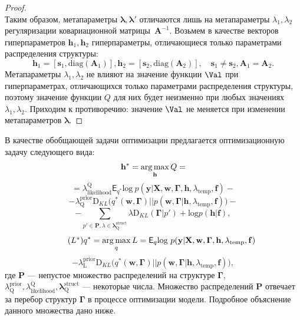 \begin{proof}
\[\]
Таким образом, метапараметры $\boldsymbol{\lambda},\boldsymbol{\lambda}'$ отличаются лишь на метапараметры  $\lambda_1, \lambda_2$ регуляризации ковариационной матрицы~$\mathbf{A}^{-1}$. 
Возьмем в качестве векторов гиперпараметров $\mathbf{h}_1,\mathbf{h}_2$ гиперпараметры, отличающиеся только параметрами распределения структуры:
\[
    \mathbf{h}_1 = [\mathbf{s}_1, \text{diag}(\mathbf{A}_1)], \mathbf{h}_2 = [\mathbf{s}_2, \text{diag}(\mathbf{A}_2)],\quad \mathbf{s}_1 \neq \mathbf{s}_2, \mathbf{A}_1 = \mathbf{A}_2.
\]
Метапараметры $\lambda_1, \lambda_2$ не влияют на значение функции $\Val$ при гиперпараметрах, отличающихся только параметрами распределения структуры, поэтому значение функции $Q$ для них будет неизменно при любых значениях $\lambda_1, \lambda_2$. Приходим к противоречию: значение $\Val$ не меняется при изменении метапараметров $\boldsymbol{\lambda}$.

\end{proof}
\iffalse
В качестве обобщающей задачи оптимизации предлагается оптимизационную задачу следующего вида:
\begin{equation}
\label{eq:qopt}
\mathbf{h}^{*} = \operatorname*{arg\,max}_{\mathbf{h}} Q = 
\end{equation}
\[
= {\lambda_\text{likelihood}^\text{Q}\mathsf{E}_{{q}^{*}} \text{log}~{p(\mathbf{y} | \mathbf{X}, \mathbf{w},\boldsymbol{\Gamma}, \mathbf{h}, \lambda_\text{temp}, \mathbf{f})}}
 -\]
\vspace{-0.3cm}
\[- {\lambda^\text{prior}_\text{Q}\text{D}_{KL}\bigl( q^{*}(\mathbf{w}, \boldsymbol{\Gamma}) || p(\mathbf{w}, \boldsymbol{\Gamma} |\mathbf{h}, \lambda_{\text{temp}},\mathbf{f}) \bigr)}  -\]
\vspace{-0.3cm}
\[
-{\sum_{p' \in \mathbf{P}, \lambda \in \boldsymbol{\lambda}^\text{struct}_\text{Q}} \lambda\text{D}_{KL}(\boldsymbol{\Gamma} | p')+\text{log}p(\mathbf{h}|\mathbf{f})}, 
\]
\begin{equation}
\tag{$L^{*}$}
{q}^{*} = \argmax_{q} L = 
{\mathsf{E}_q \text{log}~{p(\mathbf{y} | \mathbf{X}, \mathbf{w}, \boldsymbol{\Gamma}, \mathbf{h}, \lambda_{\text{temp}}, \mathbf{f})}}
\end{equation}
\vspace{-0.3cm}
\[- {\lambda^\text{prior}_\text{L}\text{D}_{KL}\bigl( q^{*}(\mathbf{w}, \boldsymbol{\Gamma}) || p(\mathbf{w}, \boldsymbol{\Gamma} |\mathbf{h}, \lambda_{\text{temp}},\mathbf{f}) \bigr)},
\]
где $\mathbf{P}$ --- непустое множество распределений на структуре $\boldsymbol{\Gamma}$, $\lambda^\text{prior}_\text{Q}, \lambda_\text{likelihood}^\text{Q}, \boldsymbol{\lambda}^\text{struct}_\text{Q}$ --- некоторые числа. Множество распределений $\mathbf{P}$ отвечает за перебор структур $\boldsymbol{\Gamma}$ в процессе оптимизации модели. Подробное объяснение данного множества дано ниже. 



